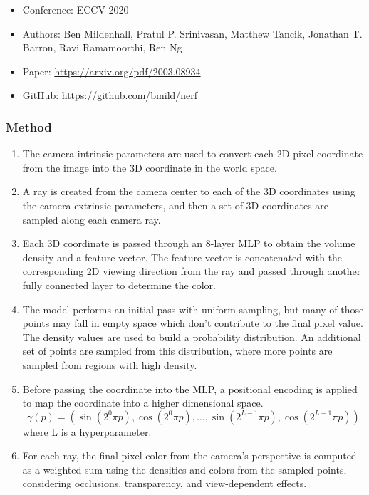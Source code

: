 \documentclass{article}
\begin{document}
\begin{itemize}
    \item Conference: ECCV 2020
    \item Authors: Ben Mildenhall, Pratul P. Srinivasan, Matthew Tancik, Jonathan T. Barron, Ravi Ramamoorthi, Ren Ng
    \item Paper: \url{https://arxiv.org/pdf/2003.08934}
    \item GitHub: \url{https://github.com/bmild/nerf}
\end{itemize}

\subsubsection*{Method}
\begin{enumerate}
    \item The camera intrinsic parameters are used to convert each 2D pixel coordinate from the image into the 3D coordinate in the world space.
    \item A ray is created from the camera center to each of the 3D coordinates using the camera extrinsic parameters, and then a set of 3D coordinates are sampled along each camera ray.
    \item Each 3D coordinate is passed through an 8-layer MLP to obtain the volume density and a feature vector. The feature vector is concatenated with the corresponding 2D viewing direction from the ray and passed through another fully connected layer to determine the color.
    \item The model performs an initial pass with uniform sampling, but many of those points may fall in empty space which don't contribute to the final pixel value. The density values are used to build a probability distribution. An additional set of points are sampled from this distribution, where more points are sampled from regions with high density.
    \item Before passing the coordinate into the MLP, a positional encoding is applied to map the coordinate into a higher dimensional space.
    \[\gamma(p)=(\sin(2^0 \pi p), \cos(2^0 \pi p), \ldots, \sin(2^{L-1}\pi p), \cos(2^{L-1}\pi p))\]
    where L is a hyperparameter.
    \item For each ray, the final pixel color from the camera's perspective is computed as a weighted sum using the densities and colors from the sampled points, considering occlusions, transparency, and view-dependent effects.
\end{enumerate}
\end{document}
